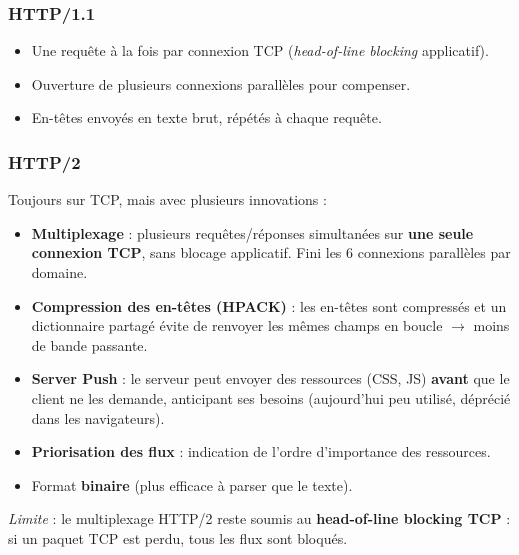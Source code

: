 \documentclass[12pt,a4paper]{article}
\begin{document}
\subsubsection*{HTTP/1.1}
\begin{itemize}
  \item Une requ\^ete \`a la fois par connexion TCP (\textit{head-of-line blocking} applicatif).
  \item Ouverture de plusieurs connexions parall\`eles pour compenser.
  \item En-t\^etes envoy\'es en texte brut, r\'ep\'et\'es \`a chaque requ\^ete.
\end{itemize}

\subsubsection*{HTTP/2 }
Toujours sur TCP, mais avec plusieurs innovations :
\begin{itemize}
  \item \textbf{Multiplexage} : plusieurs requ\^etes/r\'eponses simultan\'ees sur \textbf{une seule connexion TCP}, sans blocage applicatif. Fini les 6 connexions parall\`eles par domaine.
  \item \textbf{Compression des en-t\^etes (HPACK)} : les en-t\^etes sont compress\'es et un dictionnaire partag\'e \'evite de renvoyer les m\^emes champs en boucle $\rightarrow$ moins de bande passante.
  \item \textbf{Server Push} : le serveur peut envoyer des ressources (CSS, JS) \textbf{avant} que le client ne les demande, anticipant ses besoins (aujourd'hui peu utilis\'e, d\'epr\'eci\'e dans les navigateurs).
  \item \textbf{Priorisation des flux} : indication de l'ordre d'importance des ressources.
  \item Format \textbf{binaire} (plus efficace \`a parser que le texte).
\end{itemize}

\textit{Limite} : le multiplexage HTTP/2 reste soumis au \textbf{head-of-line blocking TCP} : si un paquet TCP est perdu, tous les flux sont bloqu\'es.
\end{document}
